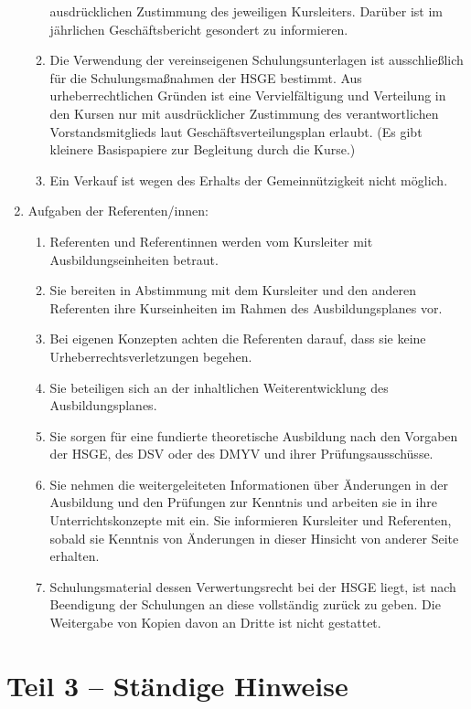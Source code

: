\documentclass[10pt, twocolumn, parskip=half]{scrartcl}
\begin{document}
\begin{enumerate}[noitemsep]
\begin{enumerate}[noitemsep]
			ausdrücklichen Zustimmung des jeweiligen Kursleiters. Darüber ist im jährlichen
			Geschäftsbericht gesondert zu informieren.
			\item Die Verwendung der vereinseigenen Schulungsunterlagen ist ausschließlich für die
			Schulungsmaßnahmen der HSGE bestimmt. Aus urheberrechtlichen Gründen ist eine
			Vervielfältigung und Verteilung in den Kursen nur mit ausdrücklicher Zustimmung des
			verantwortlichen Vorstandsmitglieds laut Geschäftsverteilungsplan erlaubt. (Es gibt kleinere
			Basispapiere zur Begleitung durch die Kurse.)
			\item Ein Verkauf ist wegen des Erhalts der Gemeinnützigkeit nicht möglich.
		\end{enumerate}
	\item Aufgaben der Referenten/innen:
		\begin{enumerate}[noitemsep]
			\item Referenten und Referentinnen werden vom Kursleiter mit Ausbildungseinheiten betraut.
			\item Sie bereiten in Abstimmung mit dem Kursleiter und den anderen Referenten ihre
			Kurseinheiten im Rahmen des Ausbildungsplanes vor.
			\item Bei eigenen Konzepten achten die Referenten darauf, dass sie keine
			Urheberrechtsverletzungen begehen.
			\item Sie beteiligen sich an der inhaltlichen Weiterentwicklung des Ausbildungsplanes.
			\item Sie sorgen für eine fundierte theoretische Ausbildung nach den Vorgaben der HSGE, des DSV
			oder des DMYV und ihrer Prüfungsausschüsse.
			\item Sie nehmen die weitergeleiteten Informationen über Änderungen in der Ausbildung und den
			Prüfungen zur Kenntnis und arbeiten sie in ihre Unterrichtskonzepte mit ein. Sie informieren
			Kursleiter und Referenten, sobald sie Kenntnis von Änderungen in dieser Hinsicht von anderer
			Seite erhalten.
			\item Schulungsmaterial dessen Verwertungsrecht bei der HSGE liegt, ist nach Beendigung der
			Schulungen an diese vollständig zurück zu geben. Die Weitergabe von Kopien davon an Dritte
			ist nicht gestattet.
		\end{enumerate}
\end{enumerate}

\section*{Teil 3 – Ständige Hinweise}
\setcounter{subsection}{0}
\end{document}
